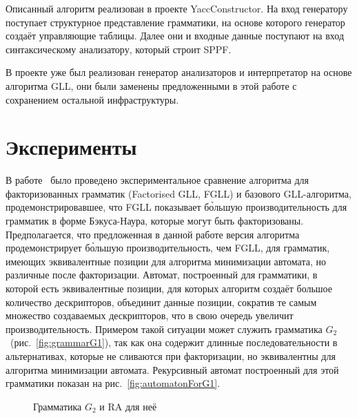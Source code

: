 \documentclass[14pt]{matmex-diploma-custom}
\begin{document}
    Описанный алгоритм реализован в проекте YaccConstructor. 
    На вход генератору поступает структурное представление грамматики, на основе которого 
    генератор создаёт управляющие таблицы. Далее они и входные данные поступают на вход
    синтаксическому анализатору, который строит SPPF. 
    
    В проекте уже был реализован генератор анализаторов и интерпретатор
    на основе алгоритма GLL, они были заменены предложенными в этой работе с сохранением остальной инфраструктуры.

	\section{Эксперименты}
    В работе~\cite{scott2016structuring}
    было проведено экспериментальное сравнение алгоритма для факторизованных грамматик (Factorised GLL, FGLL) и базового GLL-алгоритма,
    продемонстрировавшее, что FGLL показывает б\`ольшую производительность для грамматик в форме Бэкуса-Наура, которые могут быть факторизованы.
    Предполагается, что предложенная в данной работе версия алгоритма
    продемонстрирует б\`ольшую производительность, чем FGLL, для грамматик, имеющих эквивалентные позиции для алгоритма минимизации автомата, но различные после факторизации. Автомат, построенный для грамматики, в которой есть эквивалентные позиции, для которых алгоритм создаёт большое количество дескрипторов,
    объединит данные позиции, сократив те самым множество создаваемых дескрипторов,
    что в свою очередь увеличит производительность. Примером такой ситуации может служить грамматика 
    $G_2$~(рис.~\ref{fig:grammarG1}), так как она содержит длинные последовательности 
    в альтернативах, которые не сливаются при факторизации, но эквивалентны для алгоритма минимизации автомата.
    Рекурсивный автомат построенный для этой грамматики показан на рис.~\ref{fig:automatonForG1}.
    
    \begin{figure}[ht]   
        \centering
        
        \caption{Грамматика $G_2$ и RA для неё}
    \end{figure}
    
\end{document}
